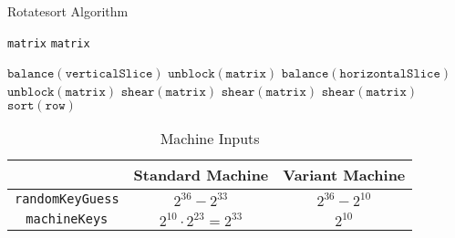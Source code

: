 \documentclass{article}
\begin{document}
        \begin{algorithm}[H]
            \scriptsize
            \caption{Rotatesort Algorithm} \label{rotatesort algorithm}
            \begin{multicols}{2}
                \begin{algorithmic}[1]
                    \Require 
                        \Statex \texttt{matrix} 
                    \Ensure
                        \Statex \texttt{matrix} 
                    \Statex
    
                        \State $\texttt{balance}{\left(\texttt{verticalSlice}\right)}$ 
                    \EndFor
                    \State $\texttt{unblock}{\left(\texttt{matrix}\right)}$
                        \State $\texttt{balance}{\left(\texttt{horizontalSlice}\right)}$
                    \EndFor
                    \State $\texttt{unblock}{\left(\texttt{matrix}\right)}$
                    \State $\texttt{shear}{\left(\texttt{matrix}\right)}$
                    \State $\texttt{shear}{\left(\texttt{matrix}\right)}$
                    \State $\texttt{shear}{\left(\texttt{matrix}\right)}$
                        \State $\texttt{sort}{\left(\texttt{row}\right)}$
                    \EndFor
                \end{algorithmic}
            \end{multicols}
        \end{algorithm}

        \begin{table}[H]
            \centering
            \bgroup
            \def\arraystretch{1.5}
                \begin{tabular}{|c|c|c|}
                     \hline
                     & Standard Machine & Variant Machine \\
                     \hline
                     \texttt{randomKeyGuess} & $2^{36} - 2^{33}$ & $2^{36} - 2^{10}$ \\
                     \hline
                     \texttt{machineKeys} & $2^{10} \cdot 2^{23} = 2^{33}$ & $2^{10}$ \\
                    \hline
                \end{tabular}
            \egroup
            \caption{Machine Inputs}
            \label{tab:machine inputs}
        \end{table}
\end{document}
